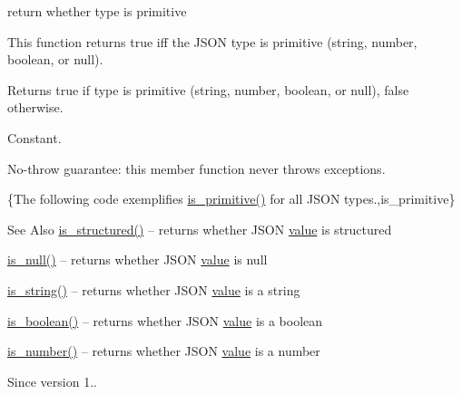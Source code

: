 return whether type is primitive 

This function returns true iff the J\-S\-O\-N type is primitive (string, number, boolean, or null).

\begin{DoxyReturn}{Returns}
{\ttfamily true} if type is primitive (string, number, boolean, or null), {\ttfamily false} otherwise.
\end{DoxyReturn}
Constant.

No-\/throw guarantee\-: this member function never throws exceptions.

\{The following code exemplifies {\ttfamily \hyperlink{classnlohmann_1_1basic__json_adcd6086bac286854d5cc8b7f84d74a49}{is\-\_\-primitive()}} for all J\-S\-O\-N types.,is\-\_\-primitive\}

\begin{DoxySeeAlso}{See Also}
\hyperlink{classnlohmann_1_1basic__json_a873f4bff2f2a83f68fc1b5341ebdd446}{is\-\_\-structured()} -- returns whether J\-S\-O\-N \hyperlink{classnlohmann_1_1basic__json_a0a2cbbd95862a623e7dc5c37e67dead0}{value} is structured 

\hyperlink{classnlohmann_1_1basic__json_a8abdfc0d6e051f6fa29d49da57bce631}{is\-\_\-null()} -- returns whether J\-S\-O\-N \hyperlink{classnlohmann_1_1basic__json_a0a2cbbd95862a623e7dc5c37e67dead0}{value} is {\ttfamily null} 

\hyperlink{classnlohmann_1_1basic__json_a409e854d754f5684b2cce74ee20dbc3b}{is\-\_\-string()} -- returns whether J\-S\-O\-N \hyperlink{classnlohmann_1_1basic__json_a0a2cbbd95862a623e7dc5c37e67dead0}{value} is a string 

\hyperlink{classnlohmann_1_1basic__json_adade77415e7f7bf08a9b5150c742714d}{is\-\_\-boolean()} -- returns whether J\-S\-O\-N \hyperlink{classnlohmann_1_1basic__json_a0a2cbbd95862a623e7dc5c37e67dead0}{value} is a boolean 

\hyperlink{classnlohmann_1_1basic__json_a957eb9594c7f0ca93212c30f3a400873}{is\-\_\-number()} -- returns whether J\-S\-O\-N \hyperlink{classnlohmann_1_1basic__json_a0a2cbbd95862a623e7dc5c37e67dead0}{value} is a number
\end{DoxySeeAlso}
\begin{DoxySince}{Since}
version 1.. 
\end{DoxySince}
